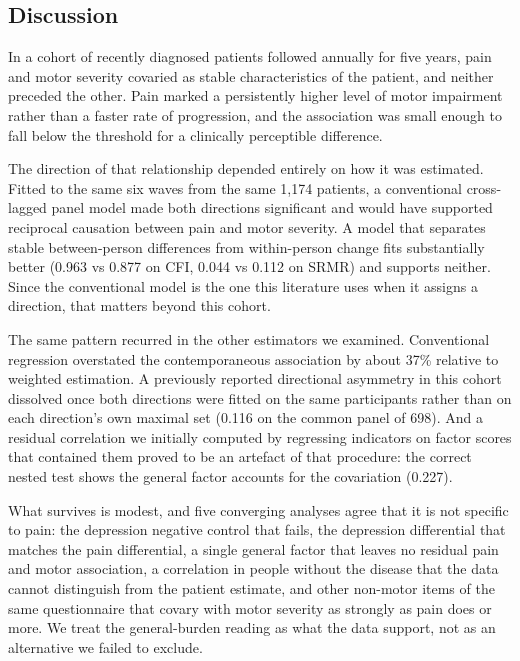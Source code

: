\documentclass[
  english,
  12pt,
]{article}
\begin{document}
\subsection{Discussion}\label{discussion}

In a cohort of recently diagnosed patients followed annually for five years, pain and motor severity covaried as stable characteristics of the patient, and neither preceded the other. Pain marked a persistently higher level of motor impairment rather than a faster rate of progression, and the association was small enough to fall below the threshold for a clinically perceptible difference.

The direction of that relationship depended entirely on how it was estimated. Fitted to the same six waves from the same 1,174 patients, a conventional cross-lagged panel model made both directions significant and would have supported reciprocal causation between pain and motor severity. A model that separates stable between-person differences from within-person change fits substantially better (0.963 vs 0.877 on CFI, 0.044 vs 0.112 on SRMR) and supports neither. Since the conventional model is the one this literature uses when it assigns a direction, that matters beyond this cohort.

The same pattern recurred in the other estimators we examined. Conventional regression overstated the contemporaneous association by about 37\% relative to weighted estimation. A previously reported directional asymmetry in this cohort dissolved once both directions were fitted on the same participants rather than on each direction's own maximal set (0.116 on the common panel of 698). And a residual correlation we initially computed by regressing indicators on factor scores that contained them proved to be an artefact of that procedure: the correct nested test shows the general factor accounts for the covariation (0.227).

What survives is modest, and five converging analyses agree that it is not specific to pain: the depression negative control that fails, the depression differential that matches the pain differential, a single general factor that leaves no residual pain and motor association, a correlation in people without the disease that the data cannot distinguish from the patient estimate, and other non-motor items of the same questionnaire that covary with motor severity as strongly as pain does or more. We treat the general-burden reading as what the data support, not as an alternative we failed to exclude.
\end{document}
